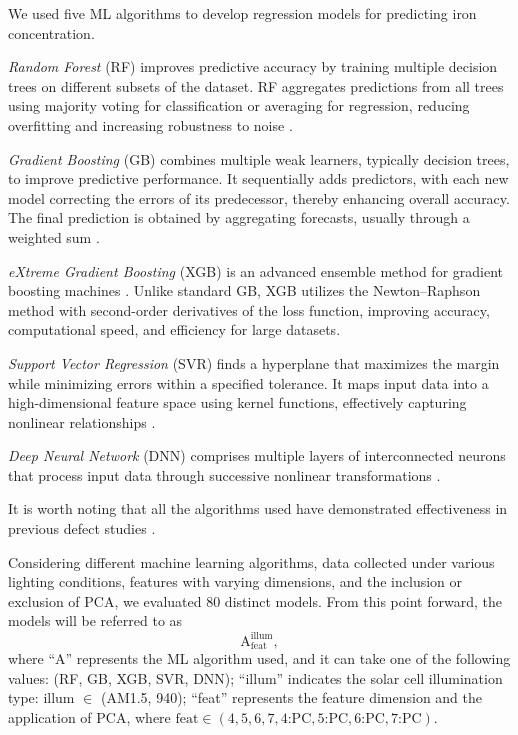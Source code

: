 \documentclass[a4paper,fleqn,draft]{cas-sc}
\begin{document}
We used five ML algorithms to develop regression models for predicting iron concentration.

\emph{Random Forest} (RF) improves predictive accuracy by training multiple decision trees on different subsets of the dataset.
RF aggregates predictions from all trees using majority voting for classification or averaging for regression,
reducing overfitting and increasing robustness to noise \cite{Breiman2001}.

\emph{Gradient Boosting} (GB) combines multiple weak learners, typically decision trees, to improve predictive performance.
It sequentially adds predictors, with each new model correcting the errors of its predecessor, thereby enhancing overall accuracy.
The final prediction is obtained by aggregating forecasts, usually through a weighted sum \cite{Natekin2013}.

\emph{eXtreme Gradient Boosting} (XGB) is an advanced ensemble method for gradient boosting machines \cite{Akinpelu2024}.
Unlike standard GB, XGB utilizes the Newton–Raphson method with second-order derivatives of the loss function,
improving accuracy, computational speed, and efficiency for large datasets.

\emph{Support Vector Regression }(SVR) finds a hyperplane that maximizes the margin while minimizing errors within a specified tolerance.
It maps input data into a high-dimensional feature space using kernel functions, effectively capturing nonlinear relationships \cite{Cao2020}.

\emph{Deep Neural Network} (DNN) comprises multiple layers of interconnected neurons that process input data
through successive nonlinear transformations \cite{Liu2023}.

It is worth noting that all the algorithms used have demonstrated effectiveness in previous
defect studies \cite{Buratti2020a, Buratti2022, Olikh2022PPV, Buratti2024}.

Considering different machine learning algorithms, data collected under various lighting conditions,
features with varying dimensions, and the inclusion or exclusion of PCA, we evaluated 80 distinct models.
From this point forward, the models will be referred to as
\begin{equation*}
    \mathrm{A}^\mathrm{illum}_\mathrm{feat},
\end{equation*}
where ``A'' represents the ML algorithm used,
and it can take one of the following values: (RF, GB, XGB, SVR, DNN);
``illum'' indicates the solar cell illumination type: illum $\in$ (AM1.5, 940);
``feat'' represents the feature dimension and the application of PCA,
where $\mathrm{feat} \in (4, 5, 6, 7, 4\text{:PC}, 5\text{:PC}, 6\text{:PC}, 7\text{:PC})$.
\end{document}
